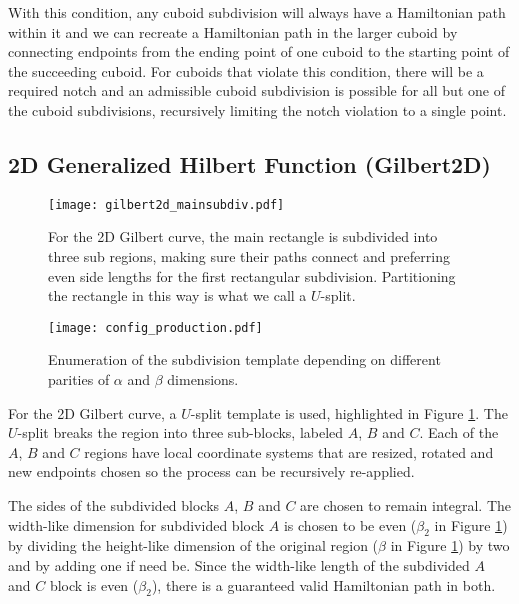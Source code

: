 With this condition, any cuboid subdivision will always have a Hamiltonian path within it and we can recreate a Hamiltonian
path in the larger cuboid by connecting endpoints from the ending point of one cuboid to the starting point of the succeeding cuboid.
For cuboids that violate this condition, there will be a required notch and
an admissible cuboid subdivision is possible
for all but one of the cuboid subdivisions, recursively limiting the notch violation to a single point.




\subsection{2D Generalized Hilbert Function (Gilbert2D)}

\begin{figure}[h]
  \centering
  \texttt{[image: gilbert2d\_mainsubdiv.pdf]}
  \caption{ For the 2D Gilbert curve, the main rectangle is subdivided into three sub regions, making sure their paths connect
            and preferring even side lengths for the first rectangular subdivision.
            Partitioning the rectangle in this way is what we call a $U$-split.  }
  \label{fig:main2dsubdiv}
\end{figure}


\begin{figure*}[ht]
  \centering
  \texttt{[image: config\_production.pdf]}
  \caption{ Enumeration of the subdivision template depending on different parities of $\alpha$ and $\beta$ dimensions. }
  \label{fig:production2d}
\end{figure*}

For the 2D Gilbert curve, a $U$-split template is used, highlighted in Figure \ref{fig:main2dsubdiv}.
The $U$-split breaks the region into three sub-blocks, labeled $A$, $B$ and $C$.
Each of the $A$, $B$ and $C$ regions have local coordinate systems that are resized, rotated and
new endpoints chosen so the process can be recursively re-applied.

The sides of the subdivided blocks $A$, $B$ and $C$ are chosen to remain integral.
The width-like dimension for subdivided block $A$ is chosen to be even ($\beta_2$ in Figure \ref{fig:main2dsubdiv})
by dividing the height-like dimension of the original region ($\beta$ in Figure \ref{fig:main2dsubdiv}) by two and by adding one if need be.
Since the width-like length of the subdivided $A$ and $C$ block is even ($\beta_2$), there is a guaranteed valid Hamiltonian path 
in both.

